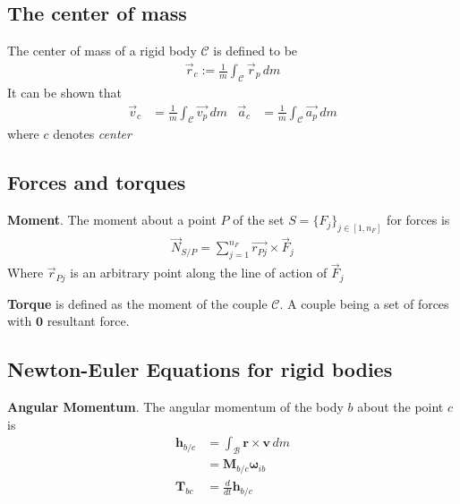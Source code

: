 \subsection{The center of mass} %

The center of mass of a rigid body \(\mathcal{C}\) is defined to be
\begin{align*}
    \vec{r}_c := \frac{1}{m}\int_{\mathcal{C}}\vec{r}_p\,dm
\end{align*}
It can be shown that
\begin{align*}
    \vec{v}_c &= \frac{1}{m}\int_{\mathcal{C}}\vec{v_p}\,dm  &
    \vec{a}_c &= \frac{1}{m}\int_{\mathcal{C}}\vec{a_p}\,dm
\end{align*}
where \(c\) denotes \textit{center}



\setcounter{section}{7}
\setcounter{subsection}{1}
\subsection{Forces and torques} %

\textbf{Moment}. The moment about a point \(P\) of the set \(S = \{F_j\}_{j\in[1,n_F]}\) for forces is
\begin{align*}
    \vec{N}_{S/P} = \sum_{j=1}^{n_F}\vec{r_{Pj}}\times \vec{F}_j
\end{align*}
Where \(\vec{r}_{Pj}\) is an arbitrary point along the line of action of \(\vec{F}_j\)
\newline


\textbf{Torque} is defined as the moment of the couple \(\mathcal{C}\). A couple being a set of forces with \(\bm{0}\) resultant force.
\newline

\subsection{Newton-Euler Equations for rigid bodies} %

\textbf{Angular Momentum}. The angular momentum of the body \(b\) about the point \(c\) is
\begin{align*}
    \bm{h}_{b/c} &= \int_\mathcal{B} \bm{r}\times\bm{v} \,dm \\
    &= \bm{M}_{b/c}\bm{\omega}_{ib} \\
    \bm{T}_{bc} &= \frac{d}{dt}\bm{h}_{b/c}
\end{align*}


